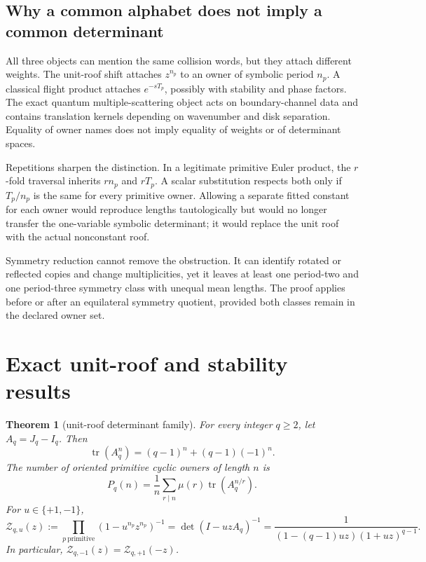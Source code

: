 \documentclass[11pt,a4paper]{article}
\newtheorem{theorem}{Theorem}[section]
\theoremstyle{definition}
\theoremstyle{remark}
\newcommand{\tr}{\operatorname{tr}}
\newcommand{\Zeta}{\mathcal Z}
\begin{document}
\subsection{Why a common alphabet does not imply a common determinant}

All three objects can mention the same collision words, but they attach different weights. The unit-roof shift attaches \(z^{n_p}\) to an owner of symbolic period \(n_p\). A classical flight product attaches \(e^{-sT_p}\), possibly with stability and phase factors. The exact quantum multiple-scattering object acts on boundary-channel data and contains translation kernels depending on wavenumber and disk separation. Equality of owner names does not imply equality of weights or of determinant spaces.

Repetitions sharpen the distinction. In a legitimate primitive Euler product, the \(r\)-fold traversal inherits \(rn_p\) and \(rT_p\). A scalar substitution respects both only if \(T_p/n_p\) is the same for every primitive owner. Allowing a separate fitted constant for each owner would reproduce lengths tautologically but would no longer transfer the one-variable symbolic determinant; it would replace the unit roof with the actual nonconstant roof.

Symmetry reduction cannot remove the obstruction. It can identify rotated or reflected copies and change multiplicities, yet it leaves at least one period-two and one period-three symmetry class with unequal mean lengths. The proof applies before or after an equilateral symmetry quotient, provided both classes remain in the declared owner set.

\section{Exact unit-roof and stability results}

\begin{theorem}[unit-roof determinant family]\label{thm:qfamily}
For every integer \(q\ge2\), let \(A_q=J_q-I_q\). Then
\begin{equation}\label{eq:traceq}
 \tr(A_q^n)=(q-1)^n+(q-1)(-1)^n.
\end{equation}
The number of oriented primitive cyclic owners of length \(n\) is
\begin{equation}\label{eq:primitiveq}
 P_q(n)=\frac1n\sum_{r\mid n}\mu(r)\tr(A_q^{n/r}).
\end{equation}
For \(u\in\{+1,-1\}\),
\begin{equation}\label{eq:zetaq}
 \Zeta_{q,u}(z)
 :=\prod_{p\ \mathrm{primitive}}\left(1-u^{n_p}z^{n_p}\right)^{-1}
 =\det(I-uzA_q)^{-1}
 =\frac{1}{(1-(q-1)uz)(1+uz)^{q-1}}.
\end{equation}
In particular, \(\Zeta_{q,-1}(z)=\Zeta_{q,+1}(-z)\).
\end{theorem}
\end{document}
